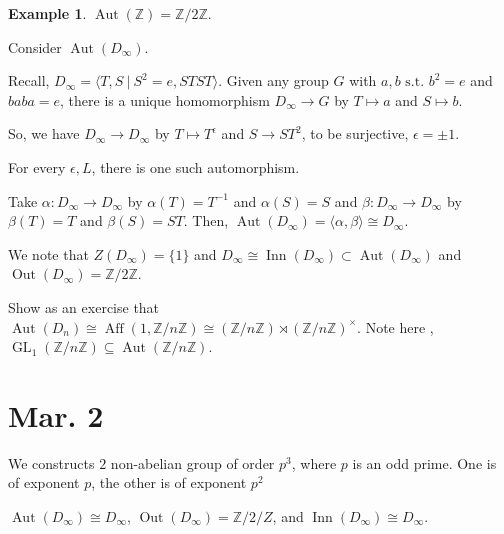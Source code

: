 \documentclass{amsart}
\theoremstyle{definition}
\newtheorem{example}[thm]{Example}
\newcommand{\Z}{\mathbb Z}
\newcommand{\st}{\text{ s.t. }}
\DeclareMathOperator{\GL}{GL}
\DeclareMathOperator{\Aut}{Aut}
\DeclareMathOperator{\Inn}{Inn}
\DeclareMathOperator{\Out}{Out}
\DeclareMathOperator{\Aff}{Aff}
\begin{document}
\begin{example}
	$\Aut(\Z)=\Z/2\Z$.
	
	Consider $\Aut(D_\infty)$.
	
	Recall, $D_\infty=\langle T,S\ |\ S^2=e, STST \rangle$. Given any group $G$ with $a,b\st b^2=e$ and $baba=e$, there is a unique homomorphism $D_\infty\to G$ by $T\mapsto a$ and $S\mapsto b$.
	
	So, we have $D_\infty\to D_\infty$ by $T\mapsto T^\epsilon$ and $S\to ST^2$, to be surjective, $\epsilon=\pm 1$.
	
	For every $\epsilon, L$, there is one such automorphism.
	
	Take $\alpha:D_\infty\to D_\infty$ by $\alpha(T)=T^{-1}$ and $\alpha(S)=S$ and $\beta:D_\infty\to D_\infty$ by $\beta(T)=T$ and $\beta(S)=ST$. Then, $\Aut(D_\infty)=\langle \alpha,\beta\rangle\cong D_\infty$.
	
	We note that $Z(D_\infty)=\{1\}$ and $D_\infty\cong \Inn(D_\infty)\subset \Aut(D_\infty)$ and $\Out(D_\infty)=\Z/2\Z$.
\end{example}
Show as an exercise that $\Aut(D_n)\cong \Aff(1,\Z/n\Z)\cong (\Z/n\Z)\rtimes(\Z/n\Z)^\times$. Note here ,$\GL_1(\Z/n\Z)\subseteq \Aut(\Z/n\Z)$.











\section{Mar. 2}
We constructs $2$ non-abelian group of order $p^3$, where $p$ is an odd prime. One is of exponent $p$, the other is of exponent $p^2$

$\Aut(D_\infty)\cong D_\infty$, $\Out(D_\infty)=\Z/2/Z$, and $\Inn(D_\infty)\cong D_\infty$.
\end{document}
